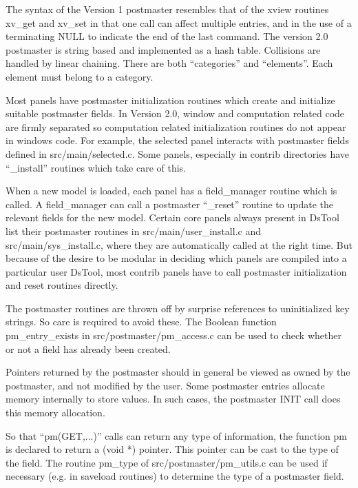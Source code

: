 The syntax of the Version 1 postmaster resembles that of the xview
routines xv\_get and xv\_set in that one call can affect multiple entries,
and in the use of a terminating NULL to indicate the end of the 
last command.
The version 2.0 postmaster is string based and implemented as
a hash table. Collisions are handled by linear chaining.
There are both ``categories'' and ``elements''. Each element must
belong to a category. 

Most panels have postmaster initialization
routines which create and initialize suitable postmaster fields.
In Version 2.0, window and computation related code are firmly separated
so computation related initialization routines do not appear in
windows code. For example, the selected panel interacts  with postmaster 
fields defined in src/main/selected.c. Some panels, especially in contrib
directories have ``\_install'' routines which take care of this. 

When a new model is loaded, each panel has a field\_manager routine which
is called. A field\_manager can call a postmaster ``\_reset'' routine to
update the relevant fields for the new model. Certain core panels
always present in DsTool list their postmaster routines in 
src/main/user\_install.c and src/main/sys\_install.c, where they are
automatically called at the right time. But because of the desire
to be modular in deciding which panels are compiled into a particular
user DsTool, most contrib panels have to call postmaster initialization
and reset routines directly.

The postmaster routines are thrown off by surprise references to 
uninitialized key strings. So care is required to avoid these.
The Boolean function pm\_entry\_exists in src/postmaster/pm\_access.c
can be used to check whether or not a field has already been created.

Pointers returned by the postmaster should in general be viewed as owned
by the postmaster, and not modified by the user. Some postmaster
entries allocate memory internally to store values. In such cases, the
postmaster INIT call does this memory allocation.

So that ``pm(GET,...)'' calls can return any type of information, the 
function pm is declared to return a (void *) pointer. This pointer can be
cast to the type of the field. The routine pm\_type of 
src/postmaster/pm\_utils.c can be used if necessary (e.g. in saveload routines)
to determine the type of a postmaster field.

